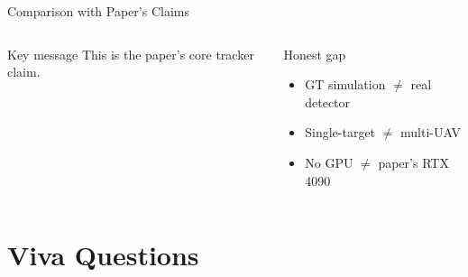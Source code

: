 \documentclass[aspectratio=169, 10pt]{beamer}
\begin{document}
\begin{frame}{Comparison with Paper's Claims}
\begin{columns}[T]
\begin{alertblock}{Key message}
      \vspace{0.5em}
      This is the paper's core tracker claim.
    \end{alertblock}

    \vspace{0.5em}
    \begin{block}{Honest gap}
      \begin{itemize}
        \item GT simulation $\neq$ real detector
        \item Single-target $\neq$ multi-UAV
        \item No GPU $\neq$ paper's RTX 4090
      \end{itemize}
    \end{block}

  \end{columns}
\end{frame}

\section{Viva Questions}
\end{document}

